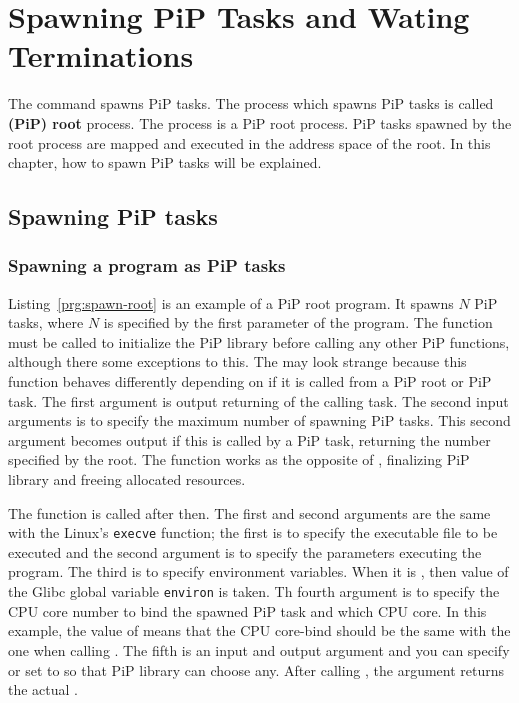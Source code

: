 
\section{Spawning PiP Tasks and Wating Terminations}

The  command spawns PiP tasks. The
process which spawns PiP tasks is called {\bf (PiP) root} process. The
 process is a PiP root process. 
PiP tasks spawned by the root process are mapped and executed in the
address space of the root. In this chapter, how to spawn PiP tasks
will be explained.

\subsection{Spawning PiP tasks}

\subsubsection{Spawning a program as PiP tasks}

Listing~\ref{prg:spawn-root} is an example of a PiP root program. It
spawns $N$ PiP tasks, where $N$ is specified by the first parameter
of the program. The  function must be called to
initialize the PiP library before calling any other PiP functions,
although there some exceptions to this. The  may
look strange because this function behaves differently depending
on if it is called from a PiP root or PiP task. The first argument is
output returning {\PIPID} of the calling task. The second input
arguments is to specify the maximum number of spawning PiP tasks. This
second argument becomes output if this is called by a PiP task,
returning the number specified by the root.
The  function works as the opposite of
, finalizing PiP library and freeing allocated 
resources. 

The  function is called after then. The first and
second arguments are the same with the Linux's {\tt execve}
function; the first is to specify the executable file to be executed
and the second argument is to specify the parameters executing the
program. The third is to specify environment variables. When it is
{\NULL}, then value of the Glibc global variable {\tt environ} is
taken. Th fourth argument is to specify the CPU core number to bind
the spawned PiP task and which CPU core. In this example, the value of
 means that the CPU core-bind should be the
same with the one when calling . The fifth
is an input and output argument and you can specify {\PIPID} or
set to  so that PiP library can choose
any. After calling , the argument returns the
actual {\PIPID}. 


